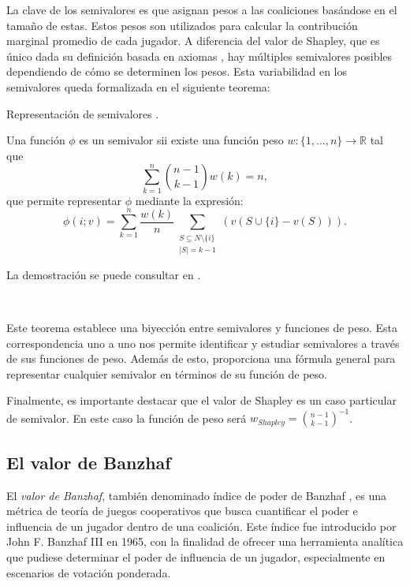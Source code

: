 La clave de los semivalores es que asignan pesos a las
coaliciones basándose en el tamaño de estas. Estos pesos
son utilizados para calcular la contribución marginal promedio
de cada jugador. A diferencia del valor de Shapley, que es
único dada su definición basada en axiomas \cite{shapleyValue},
hay múltiples semivalores posibles dependiendo de cómo se
determinen los pesos. Esta variabilidad en los semivalores queda
formalizada en el siguiente teorema:

\begin{theorem}{Representación de semivalores \cite{Dubey2}.}
  
  Una función $\phi$ \index{$\phi$} es un semivalor sii
  existe una función peso $w:\{1,\dots,n\} \rightarrow
  \mathbb{R}$ tal que  
  $$\sum_{k=1}^n \binom{n-1}{k-1}w(k) = n,$$
  que permite representar $\phi$ mediante la expresión:
  $$
  \phi(i;v) = \sum_{k=1}^n \frac{w(k)}{n}
  \sum_{\substack{S \subseteq N \setminus \{i\} \\ |S|=k-1}}
  (v(S\cup \{i\} - v(S))).
  $$
\end{theorem}

La demostración se puede consultar en \cite{Dubey2}.

\

Este teorema establece una biyección entre semivalores y
funciones de peso. Esta correspondencia uno a uno
nos permite identificar y estudiar semivalores a través
de sus funciones de peso. Además de esto, proporciona
una fórmula general para representar cualquier semivalor
en términos de su función de peso.

Finalmente, es importante destacar que el valor de Shapley
es un caso particular de semivalor. En este caso la función
de peso será $w_{Shapley} = \binom{n-1}{k-1}^{-1}$.


\subsection{El valor de Banzhaf}

El \emph{valor de Banzhaf}, también denominado índice de poder
de Banzhaf \cite{banzhaf}, es una métrica de teoría de juegos
cooperativos que busca cuantificar el poder e influencia de un
jugador dentro de una coalición. 
Este índice fue introducido por John F. Banzhaf III en 1965,
con la finalidad de ofrecer una herramienta analítica que
pudiese determinar el poder de influencia de un jugador,
especialmente en escenarios de votación ponderada.

